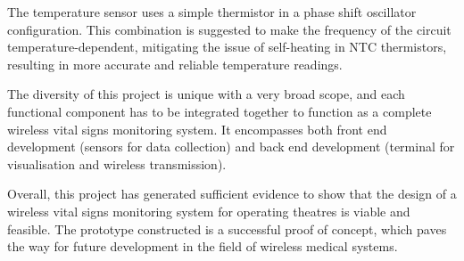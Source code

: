 The temperature sensor uses a simple thermistor in a phase shift oscillator configuration. This combination is suggested to make the frequency of the circuit temperature-dependent, mitigating the issue of self-heating in NTC thermistors, resulting in more accurate and reliable temperature readings. 

The diversity of this project is unique with a very broad scope, and each functional component has to be integrated together to function as a complete wireless vital signs monitoring system. It encompasses both front end development (sensors for data collection) and back end development (terminal for visualisation and wireless transmission). 

Overall, this project has generated sufficient evidence to show that the design of a wireless vital signs monitoring system for operating theatres is viable and feasible. The prototype constructed is a successful proof of concept, which paves the way for future development in the field of wireless medical systems.  